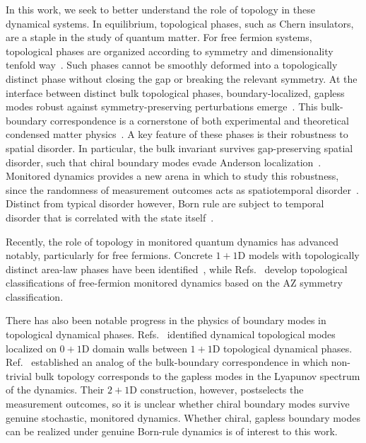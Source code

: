 \documentclass[aps,prb,10pt,twocolumn,superscriptaddress,longbibliography,floatfix]{revtex4-2}
\begin{document}
In this work, we seek to better understand the role of topology in these dynamical systems. In equilibrium, topological phases, such as Chern insulators, are a staple in
the study of quantum matter. For free fermion systems, topological phases are organized according to symmetry and dimensionality tenfold way~\cite{AltlandZirnbauer1997,SchnyderRyuFurusakiLudwig2008,Kitaev2009,RyuSchnyderFurusakiLudwig2010,ChiuTeoSchnyderRyu2016}.
Such phases cannot be smoothly deformed into a topologically distinct phase without closing the gap or breaking the relevant symmetry. At the interface between distinct bulk topological phases, boundary-localized, gapless modes robust against symmetry-preserving
perturbations emerge~\cite{Halperin1982,Hatsugai1993,TeoKane2010}. This bulk-boundary correspondence is a cornerstone of both experimental and theoretical condensed matter physics~\cite{HasanKane2010,QiZhang2011}. A key feature of these phases is their robustness to spatial disorder. In particular, the bulk invariant survives gap-preserving spatial disorder, such that chiral boundary modes 
evade Anderson localization~\cite{Halperin1982,EversMirlin2008}. Monitored dynamics provides a new arena in which to study this robustness, since the randomness of measurement outcomes acts as spatiotemporal disorder~\cite{JianBauerKeselmanLudwig2022}. Distinct from typical disorder however, Born rule are subject to temporal disorder that is correlated with the state itself~\cite{JianShapourianBauerLudwig2023,FavaEtAl2023}.

Recently, the role of topology in monitored quantum dynamics has advanced notably, particularly for free fermions. Concrete $1+1$D models with topologically distinct area-law phases have been identified~\cite{KellsMeidanRomito2023,BehrendsVennBeri2024,PanShapourianJian2025,Oshima2025, yang2026decoding}, while Refs.~\cite{BhuiyanPanJian2026,XiaoKawabata2026} develop topological classifications of free-fermion monitored dynamics based on the AZ symmetry classification.

There has also been notable progress in the physics of boundary modes in topological dynamical phases.  Refs.~\cite{PanShapourianJian2025, Oshima2025} identified dynamical topological modes localized on $0+1$D domain walls between $1+1$D topological dynamical phases. Ref.~\cite{XiaoKawabata2026}
established an analog of the bulk-boundary correspondence in which non-trivial bulk topology corresponds to the gapless modes in the Lyapunov spectrum of the dynamics. Their $2+1$D construction, however, postselects the measurement outcomes, so it is unclear whether chiral boundary modes survive genuine stochastic, monitored dynamics. Whether chiral, gapless boundary modes can be realized under genuine Born-rule dynamics is of interest to this work.
\end{document}
